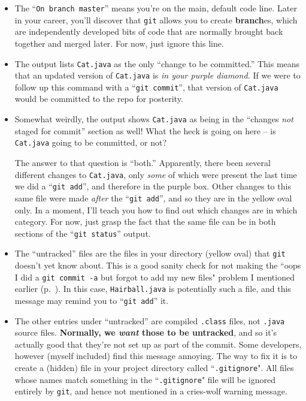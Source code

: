 \begin{itemize}

\item The ``\texttt{On branch master}'' means you're on the main, default code
line. Later in your career, you'll discover that \texttt{git} allows you to
create \textbf{branch}es, which are independently developed bits of code that
are normally brought back together and merged later. For now, just ignore this
line.

\item The output lists \texttt{Cat.java} as the only ``change to be
committed.'' This means that an updated version of \texttt{Cat.java} is
\textit{in your purple diamond.} If we were to follow up this command with a
``\texttt{git commit}'', that version of \texttt{Cat.java} would be committed
to the repo for posterity.

\item Somewhat weirdly, the output shows \texttt{Cat.java} as being in the
``changes \textit{not} staged for commit'' section as well! What the heck is
going on here -- is \texttt{Cat.java} going to be committed, or not?

The answer to that question is ``both.'' Apparently, there been several
different changes to \texttt{Cat.java}, only \textit{some} of which were
present the last time we did a ``\texttt{git add}'', and therefore in the
purple box. Other changes to this same file were made \textit{after} the
``\texttt{git add}'', and so they are in the yellow oval only. In a moment,
I'll teach you how to find out which changes are in which category. For now,
just grasp the fact that the same file can be in both sections of the
``\texttt{git status}'' output.

\item The ``untracked'' files are the files in your directory (yellow oval)
that \texttt{git} doesn't yet know about. This is a good sanity check for not
making the ``oops I did a \texttt{git commit -a} but forgot to add my new
files" problem I mentioned earlier (p.~\pageref{commitPitfall}). In this case,
\texttt{Hairball.java} is
potentially such a file, and this message may remind you to ``\texttt{git
add}'' it.

\item The other entries under ``untracked'' are compiled \texttt{.class}
files, not \texttt{.java} source files. \textbf{Normally, we \textit{want}
those to be untracked}, and so it's actually good that they're not set up as
part of the commit. Some developers, however (myself included) find this
message annoying. The way to fix it is to create a (hidden) file in your
project directory called ``\texttt{.gitignore}". All files whose names match
something in the ``\texttt{.gitignore}" file will be ignored entirely by
\texttt{git}, and hence not mentioned in a cries-wolf warning message.


\end{itemize}
